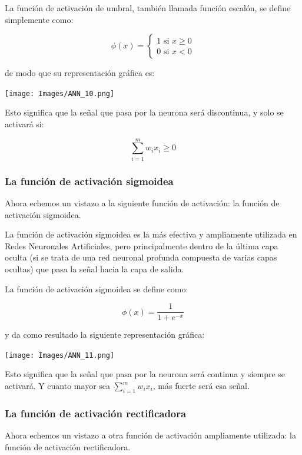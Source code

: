 \documentclass[
]{book}
\begin{document}
La función de activación de umbral, también llamada función escalón, se define simplemente como:

\[
\phi(x) =
    \begin{cases}
        1 \textrm{ si } x \ge 0 \\
        0 \textrm{ si } x < 0
    \end{cases}
\]

de modo que su representación gráfica es:

\texttt{[image: Images/ANN\_10.png]}

Esto significa que la señal que pasa por la neurona será discontinua, y solo se activará si:

\[\sum_{i=1}^m w_i x_i \ge 0\]

\hypertarget{la-funciuxf3n-de-activaciuxf3n-sigmoidea}{%
\subsubsection{La función de activación sigmoidea}\label{la-funciuxf3n-de-activaciuxf3n-sigmoidea}}

Ahora echemos un vistazo a la siguiente función de activación: la función de activación sigmoidea.

La función de activación sigmoidea es la más efectiva y ampliamente utilizada en Redes Neuronales Artificiales, pero principalmente dentro de la última capa oculta (si se trata de una red neuronal profunda compuesta de varias capas ocultas) que pasa la señal hacia la capa de salida.

La función de activación sigmoidea se define como:

\[\phi(x) = \frac{1}{1+e^{-x}}\]

y da como resultado la siguiente representación gráfica:

\texttt{[image: Images/ANN\_11.png]}

Esto significa que la señal que pasa por la neurona será continua y siempre se activará. Y cuanto mayor sea \(\sum_{i = 1}^m w_i x_i\), más fuerte será esa señal.

\hypertarget{la-funciuxf3n-de-activaciuxf3n-rectificadora}{%
\subsubsection{La función de activación rectificadora}\label{la-funciuxf3n-de-activaciuxf3n-rectificadora}}

Ahora echemos un vistazo a otra función de activación ampliamente utilizada: la función de activación rectificadora.
\end{document}
